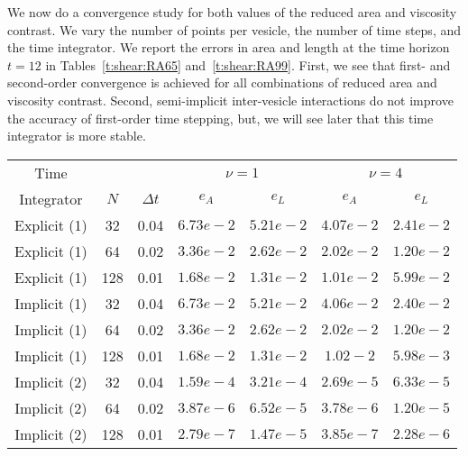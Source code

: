 We now do a convergence study for both values of the reduced area and
viscosity contrast.  We vary the number of points per vesicle, the
number of time steps, and the time integrator.  We report the errors in
area and length at the time horizon $t=12$ in Tables~\ref{t:shear:RA65}
and~\ref{t:shear:RA99}.  First, we see that first- and second-order
convergence is achieved for all combinations of reduced area and
viscosity contrast.  Second, semi-implicit inter-vesicle interactions
do not improve the accuracy of first-order time stepping, but, we will
see later that this time integrator is more stable.

\begin{table}[htp]
\centering
\begin{tabular}{ccc|cc|cc} 
Time & & & \multicolumn{2}{c|}{$\nu=1$} & \multicolumn{2}{c}{$\nu=4$} \\
Integrator   & $N$ & $\Delta t$ & $e_{A}$   & $e_{L}$   & 
$e_{A}$   & $e_{L}$ \\ 
\hline

Explicit (1) & 32  & 0.04       & $6.73e-2$ & $5.21e-2$ &
$4.07e-2$ & $2.41e-2$ \\ 

Explicit (1) & 64  & 0.02       & $3.36e-2$ & $2.62e-2$ &
$2.02e-2$ & $1.20e-2$ \\ 

Explicit (1) & 128 & 0.01       & $1.68e-2$ & $1.31e-2$ &
$1.01e-2$ & $5.99e-2$ \\ 
\hline

Implicit (1) & 32  & 0.04       & $6.73e-2$ & $5.21e-2$ &
$4.06e-2$ & $2.40e-2$ \\ 

Implicit (1) & 64  & 0.02       & $3.36e-2$ & $2.62e-2$ &
$2.02e-2$ & $1.20e-2$ \\ 

Implicit (1) & 128 & 0.01       & $1.68e-2$ & $1.31e-2$ &
$1.02-2$ & $5.98e-3$ \\ 
\hline

Implicit (2) & 32  & 0.04       & $1.59e-4$ & $3.21e-4$ &
$2.69e-5$ & $6.33e-5$ \\ 

Implicit (2) & 64  & 0.02       & $3.87e-6$ & $6.52e-5$ &
$3.78e-6$ & $1.20e-5$ \\ 

Implicit (2) & 128 & 0.01       & $2.79e-7$ & $1.47e-5$ &
$3.85e-7$ & $2.28e-6$ 
\end{tabular}


\end{table}
